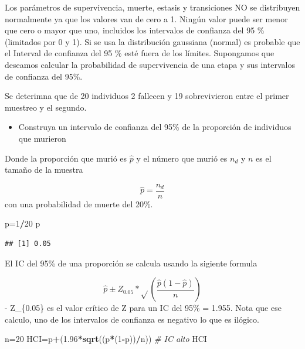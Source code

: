 \documentclass[
]{book}
\newenvironment{Shaded}{\begin{snugshade}}{\end{snugshade}}
\newcommand{\CommentTok}[1]{\textcolor[rgb]{0.56,0.35,0.01}{\textit{#1}}}
\newcommand{\DecValTok}[1]{\textcolor[rgb]{0.00,0.00,0.81}{#1}}
\newcommand{\FloatTok}[1]{\textcolor[rgb]{0.00,0.00,0.81}{#1}}
\newcommand{\FunctionTok}[1]{\textcolor[rgb]{0.13,0.29,0.53}{\textbf{#1}}}
\newcommand{\NormalTok}[1]{#1}
\newcommand{\OtherTok}[1]{\textcolor[rgb]{0.56,0.35,0.01}{#1}}
\newcommand{\SpecialCharTok}[1]{\textcolor[rgb]{0.81,0.36,0.00}{\textbf{#1}}}
\providecommand{\tightlist}{%
  \setlength{\itemsep}{0pt}\setlength{\parskip}{0pt}}
\theoremstyle{definition}
\theoremstyle{definition}
\theoremstyle{definition}
\theoremstyle{definition}
\theoremstyle{remark}
\begin{document}
Los parámetros de supervivencia, muerte, estasis y transiciones NO se distribuyen normalmente ya que los valores van de cero a 1. Ningún valor puede ser menor que cero o mayor que uno, incluidos los intervalos de confianza del 95 \% (limitados por 0 y 1). Si se usa la distribución gaussiana (normal) es probable que el Interval de confianza del 95 \% esté fuera de los límites. Supongamos que deseamos calcular la probabilidad de supervivencia de una etapa y sus intervalos de confianza del 95\%.

Se deterimna que de 20 individuos 2 fallecen y 19 sobrevivieron entre el primer muestreo y el segundo.

\begin{itemize}
\tightlist
\item
  Construya un intervalo de confianza del 95\% de la proporción de individuos que murieron
\end{itemize}

Donde la proporción que murió es \(\hat{p}\) y el número que murió es \(n_d\) y \(n\) es el tamaño de la muestra

\[\hat{p}=\frac{n_d}{n}\] con una probabilidad de muerte del 20\%.

\begin{Shaded}
\begin{Highlighting}[]
\NormalTok{p}\OtherTok{=}\DecValTok{1}\SpecialCharTok{/}\DecValTok{20}
\NormalTok{p}
\end{Highlighting}
\end{Shaded}

\begin{verbatim}
## [1] 0.05
\end{verbatim}

El IC del 95\% de una proporción se calcula usando la sigiente formula

\[\hat{p}\pm Z_{0.05}*\sqrt{}(\frac{\hat{p}(1-\hat{p})}{n})\]
- Z\_\{0.05\} es el valor crítico de Z para un IC del 95\% = 1.955. Nota que ese calculo, uno de los intervalos de confianza es negativo lo que es ilógico.

\begin{Shaded}
\begin{Highlighting}[]
\NormalTok{n}\OtherTok{=}\DecValTok{20}
\NormalTok{HCI}\OtherTok{=}\NormalTok{p}\SpecialCharTok{+}\NormalTok{(}\FloatTok{1.96}\SpecialCharTok{*}\FunctionTok{sqrt}\NormalTok{((p}\SpecialCharTok{*}\NormalTok{(}\DecValTok{1}\SpecialCharTok{{-}}\NormalTok{p))}\SpecialCharTok{/}\NormalTok{n)) }\CommentTok{\# IC alto}
\NormalTok{HCI}
\end{Highlighting}
\end{Shaded}
\end{document}
